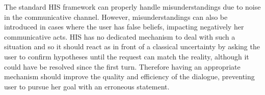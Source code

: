 \documentclass[a4paper,11pt,twoside]{StyleThese}
\begin{document}
%
The standard HIS framework can properly handle misunderstandings due to noise in the communicative channel.
However, misunderstandings can also be introduced in cases where the user has false beliefs, impacting negatively her communicative acts. HIS has no dedicated mechanism to deal with such a situation and so it should react as in front of a %
classical uncertainty by asking the user to confirm  hypotheses until the request can match the reality, although it could have be resolved since the first turn. 
Therefore having an appropriate mechanism should improve the quality and efficiency of the dialogue, preventing user to pursue her goal with an erroneous statement.
\end{document}
